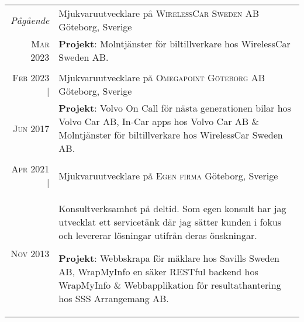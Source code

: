 \documentclass[a4paper,10pt]{scrartcl} %
\begin{document}
\begin{tabular}{r|p{15cm}}


\emph{Pågående} 	                & Mjukvaruutvecklare på \textsc{WirelessCar Sweden AB} \hfill Göteborg, Sverige \\
\phantom{ab} \textsc{Mar 2023} 	    & \footnotesize{
\textbf{Projekt}: Molntjänster för biltillverkare hos WirelessCar Sweden AB.} \\
\multicolumn{2}{c}{} \\


\textsc{Feb 2023} |	                & Mjukvaruutvecklare på \textsc{Omegapoint Göteborg AB} \hfill Göteborg, Sverige \\
\phantom{ab} \textsc{Jun 2017} 	    & \footnotesize{
\textbf{Projekt}: Volvo On Call för nästa generationen bilar hos Volvo Car AB, In-Car apps hos Volvo Car AB \& Molntjänster för biltillverkare hos WirelessCar Sweden AB.} \\
\multicolumn{2}{c}{} \\


\textsc{Apr 2021} |	                & Mjukvaruutvecklare på \textsc{Egen firma} \hfill Göteborg, Sverige \\
\phantom{ab} \textsc{Nov 2013} 	    & \footnotesize{Konsultverksamhet på deltid. Som egen konsult har jag utvecklat ett servicetänk där jag sätter kunden i fokus och levererar lösningar utifrån deras önskningar.

\textbf{Projekt}: Webbskrapa för mäklare hos Savills Sweden AB, WrapMyInfo en säker RESTful backend hos WrapMyInfo \& Webbapplikation för resultathantering hos SSS Arrangemang AB.} \\


\end{tabular}

\end{document}
